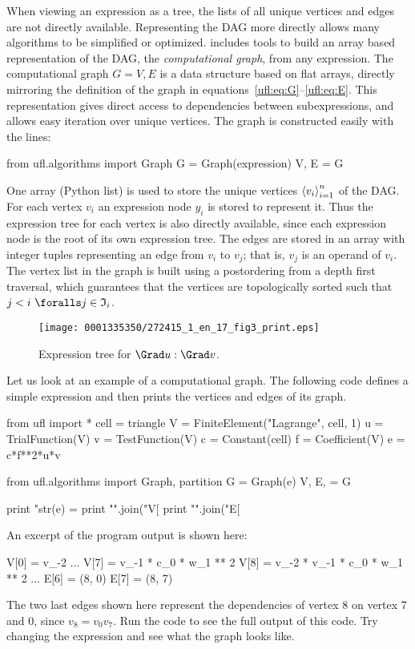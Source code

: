 When viewing an expression as a tree, the lists of all unique
vertices and edges are not directly available. Representing the DAG
more directly allows many algorithms to be simplified or optimized.
\ufl{} includes tools to build an array based representation of
the DAG, the \emph{computational graph}, from any expression.
The computational graph $G = V, E$ is a data structure based on
flat arrays, directly mirroring the definition of the graph in
equations~\eqref{ufl:eq:G}--\eqref{ufl:eq:E}.  This representation gives
direct access to dependencies between subexpressions, and allows easy
iteration over unique vertices.  The graph is constructed easily with
the lines:
\begin{python}
from ufl.algorithms import Graph
G = Graph(expression)
V, E = G
\end{python}
One array (Python list)
 is used to store the unique vertices $\left\langle{v_i}\right\rangle_{i=1}^n$ of the
DAG.  For each vertex $v_i$ an expression node $y_i$ is stored to
represent it.  Thus the expression tree for each vertex is also
directly available, since each expression node is the root of its own
expression tree. The edges are stored in an array  with
integer tuples  representing an edge from $v_i$ to $v_j$;
that is, $v_j$ is an operand of $v_i$.  The vertex list in the graph
is built using a postordering from a depth first traversal,
which guarantees that the vertices are topologically sorted
such that $j < i \,\, \foralls j \in \mI_i$.

\begin{figure}[!t]
\texttt{[image: 0001335350/272415\_1\_en\_17\_fig3\_print.eps]}
\caption{Expression tree for $\Grad \uu : \Grad \vv$.}
\label{ufl:fig:stiffness}\vspace*{6pt}
\end{figure}

Let us look at an example of a computational graph. The following code
defines a simple expression and then prints the vertices and edges
of its graph.
\begin{python}
from ufl import *
cell = triangle
V = FiniteElement("Lagrange", cell, 1)
u = TrialFunction(V)
v = TestFunction(V)
c = Constant(cell)
f = Coefficient(V)
e = c*f**2*u*v

from ufl.algorithms import Graph, partition
G = Graph(e)
V, E, = G

print "str(e) = %
print "\n".join("V[%
print "\n".join("E[%
\end{python}
An excerpt of the program output is shown here:
\begin{gencode}
V[0] = v_{-2}
...
V[7] = v_{-1} * c_0 * w_1 ** 2
V[8] = v_{-2} * v_{-1} * c_0 * w_1 ** 2
...
E[6] = (8, 0)
E[7] = (8, 7)
\end{gencode}
The two last edges shown here represent the dependencies of vertex 8
on vertex 7 and 0, since $v_8 = v_0 v_7$. Run the code to see the full
output of this code.  Try changing the expression and see what the
graph looks like.

